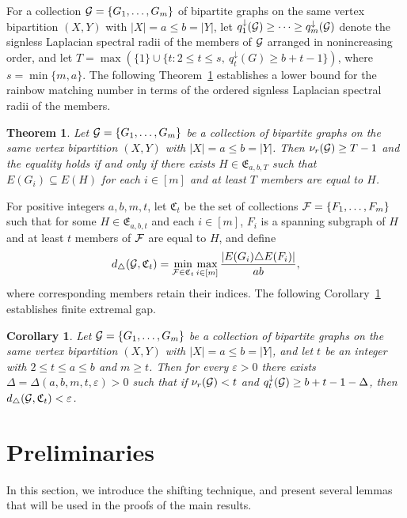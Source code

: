 \documentclass[11pt,a4paper]{article}
\newtheorem{theorem}{Theorem}[section]
\newtheorem{cor}{Corollary}[section]
\theoremstyle{definition}
\numberwithin{equation}{section}
\begin{document}
For a collection ${\cal G}=\{G_1,\ldots,G_m\}$ of bipartite graphs on the same vertex bipartition $(X,Y)$ with $|X|=a\le b=|Y|$, let $q_1^\downarrow({\cal G})\ge\cdots\ge q_m^\downarrow({\cal G})$ denote the signless Laplacian spectral radii
of the members of ${\cal G}$ arranged in nonincreasing order, and let $T=\max\left(\{1\}\cup
\{t:2\le t\le s,\ q_t^\downarrow(G)\ge b+t-1\}\right)$, where $s=\min\{m,a\}$. The following Theorem~\ref{thm-quant} establishes a lower bound for the rainbow matching number in terms of the ordered signless Laplacian spectral radii of the members.
\begin{theorem}
\label{thm-quant}
Let ${\cal G}=\{G_1,\ldots,G_m\}$ be a collection of bipartite graphs on the same vertex bipartition $(X,Y)$ with $|X|=a\le b=|Y|$. Then $\nu_r({\cal G})\ge T-1$ and the equality holds if and only if there exists $H\in\mathfrak E_{a,b,T}$ such that $E(G_i)\subseteq E(H)$ for each $i\in[m]$ and at least $T$ members are equal to $H$.
\end{theorem}

For positive integers $a,b,m,t$, let $\mathfrak C_t$ be the set of collections ${\cal F}=\{F_1,\ldots,F_m\}$ such that for some $H\in\mathfrak E_{a,b,t}$ and each $i\in[m]$, $F_i$ is a spanning subgraph of $H$ and at least $t$ members of ${\cal F}$ are equal to $H$, and define
\[
d_\triangle({\cal G},\mathfrak C_t)
=\min_{{\cal F}\in\mathfrak C_t}\max_{i\in[m]}
\frac{|E(G_i)\triangle E(F_i)|}{ab},
\]
where corresponding members retain their indices. The following Corollary~\ref{cor-finite-gap} establishes finite extremal gap.

\begin{cor}
\label{cor-finite-gap}
Let ${\cal G}=\{G_1,\ldots,G_m\}$ be a collection of bipartite graphs on the same vertex bipartition $(X,Y)$ with $|X|=a\le b=|Y|$, and let $t$ be an integer with $2\le t\le a\le b$ and $m\ge t$. Then for every $\varepsilon>0$ there exists $\Delta=\Delta(a,b,m,t,\varepsilon)>0$ such that if $\nu_r({\cal G})<t$ and $q_t^\downarrow({\cal G})\ge b+t-1-\Delta$, then $d_\triangle({\cal G},\mathfrak C_t)<\varepsilon$.
\end{cor}

\section{Preliminaries}
In this section, we introduce the shifting technique, and present several lemmas that will be used in the proofs of the main results.
\end{document}
